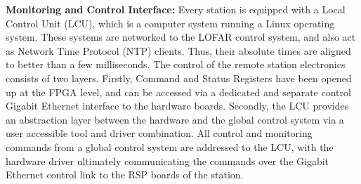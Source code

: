\documentclass{ws-jai}
\begin{document}


\noindent \textbf {Monitoring and Control  Interface:} Every station is equipped
with a  Local Control  Unit (LCU), which  is a computer  system running  a Linux
operating system.  These systems are networked  to the LOFAR control system, and
also act as Network Time Protocol  (NTP) clients. Thus, their absolute times are
aligned to  better than a  few milliseconds. The  control of the  remote station
electronics consists of  two layers. Firstly, Command and  Status Registers have
been  opened up  at the  FPGA level,  and can  be accessed  via a  dedicated and
separate control  Gigabit Ethernet interface  to the hardware  boards. Secondly,
the  LCU provides  an  abstraction layer  between the  hardware  and the  global
control system  via a user accessible  tool and driver combination.  All control
and monitoring commands  from a global control system are  addressed to the LCU,
with the hardware driver ultimately  communicating the commands over the Gigabit
Ethernet control link to the RSP boards of the station.
\end{document}
